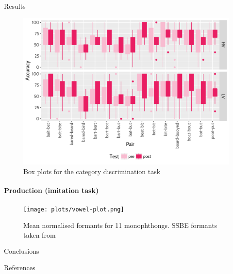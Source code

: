 \documentclass[final,xcolor={cmyk,hyperref}]{beamer}
\begin{document}
\begin{frame}[t]
\begin{columns}[t]
\begin{column}{0.5\linewidth}
\begin{block}{Results}
\vspace*{0.25in}
\begin{figure}
\includegraphics[width=\linewidth]{plots/axb-boxplot.png}
\caption{%
Box plots for the category discrimination task}
\end{figure}
\paragraph{Production (imitation task)}

\begin{figure}[h]
\texttt{[image: plots/vowel-plot.png]}
\caption{Mean normalised formants for 11 monophthongs. SSBE formants
taken from \cite{ferragne_pellegrino_2010}}
\end{figure}
\end{block}

\begin{block}{Conclusions}

\end{block}

\begin{block}{References}
  \renewcommand\bibfont{\tiny}
  \printbibliography
\end{block}


\end{column}

\end{columns}

\end{frame}
\end{document}
